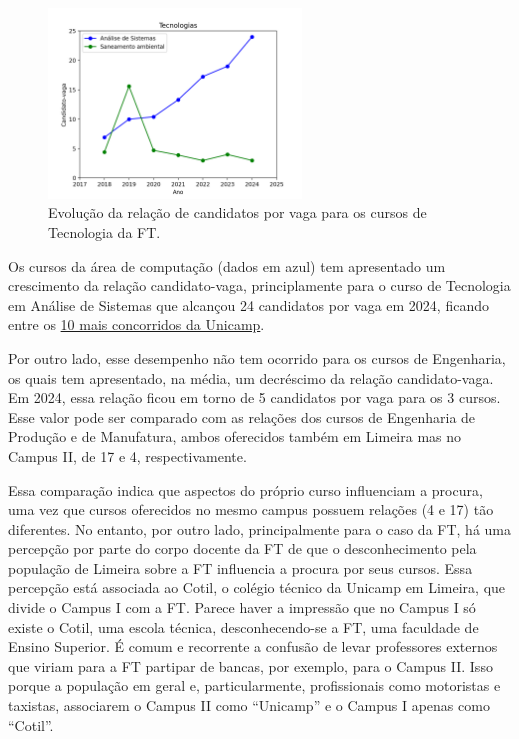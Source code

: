 \documentclass[
  letterpaper,
  DIV=11,
  numbers=noendperiod,
  oneside]{scrreprt}
\begin{document}
\begin{figure}[H]

{\centering \includegraphics[width=0.6\textwidth,height=\textheight]{justificativa/../dados/grafico-candidato-vaga-tecnologia.png}

}

\caption{Evolução da relação de candidatos por vaga para os cursos de
Tecnologia da FT.}

\end{figure}%

Os cursos da área de computação (dados em azul) tem apresentado um
crescimento da relação candidato-vaga, principlamente para o curso de
Tecnologia em Análise de Sistemas que alcançou 24 candidatos por vaga em
2024, ficando entre os
\href{https://unicamp.br/noticias/2024/09/20/comvest-registra-63-mil-estudantes-inscritos-no-vestibular-2025/}{10
mais concorridos da Unicamp}.

Por outro lado, esse desempenho não tem ocorrido para os cursos de
Engenharia, os quais tem apresentado, na média, um decréscimo da relação
candidato-vaga. Em 2024, essa relação ficou em torno de 5 candidatos por
vaga para os 3 cursos. Esse valor pode ser comparado com as relações dos
cursos de Engenharia de Produção e de Manufatura, ambos oferecidos
também em Limeira mas no Campus II, de 17 e 4, respectivamente.

Essa comparação indica que aspectos do próprio curso influenciam a
procura, uma vez que cursos oferecidos no mesmo campus possuem relações
(4 e 17) tão diferentes. No entanto, por outro lado, principalmente para
o caso da FT, há uma percepção por parte do corpo docente da FT de que o
desconhecimento pela população de Limeira sobre a FT influencia a
procura por seus cursos. Essa percepção está associada ao Cotil, o
colégio técnico da Unicamp em Limeira, que divide o Campus I com a FT.
Parece haver a impressão que no Campus I só existe o Cotil, uma escola
técnica, desconhecendo-se a FT, uma faculdade de Ensino Superior. É
comum e recorrente a confusão de levar professores externos que viriam
para a FT partipar de bancas, por exemplo, para o Campus II. Isso porque
a população em geral e, particularmente, profissionais como motoristas e
taxistas, associarem o Campus II como ``Unicamp'' e o Campus I apenas
como ``Cotil''.
\end{document}

